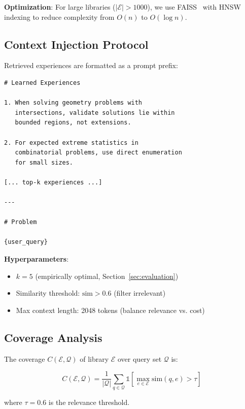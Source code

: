 \textbf{Optimization}: For large libraries ($|\mathcal{E}| > 1000$), we use FAISS~\cite{johnson2019billion} with HNSW indexing to reduce complexity from $O(n)$ to $O(\log n)$.

\subsection{Context Injection Protocol}

Retrieved experiences are formatted as a prompt prefix:

\begin{lstlisting}[caption=Context Injection Template]
# Learned Experiences

1. When solving geometry problems with 
   intersections, validate solutions lie within 
   bounded regions, not extensions.

2. For expected extreme statistics in 
   combinatorial problems, use direct enumeration 
   for small sizes.

[... top-k experiences ...]

---

# Problem

{user_query}
\end{lstlisting}

\textbf{Hyperparameters}:
\begin{itemize}
    \item $k = 5$ (empirically optimal, Section~\ref{sec:evaluation})
    \item Similarity threshold: $\text{sim} > 0.6$ (filter irrelevant)
    \item Max context length: 2048 tokens (balance relevance vs. cost)
\end{itemize}

\subsection{Coverage Analysis}

\begin{definition}
The coverage $C(\mathcal{E}, \mathcal{Q})$ of library $\mathcal{E}$ over query set $\mathcal{Q}$ is:

\begin{equation}
C(\mathcal{E}, \mathcal{Q}) = \frac{1}{|\mathcal{Q}|} \sum_{q \in \mathcal{Q}} \mathbb{1}[\max_{e \in \mathcal{E}} \text{sim}(q, e) > \tau]
\end{equation}

where $\tau = 0.6$ is the relevance threshold.
\end{definition}

